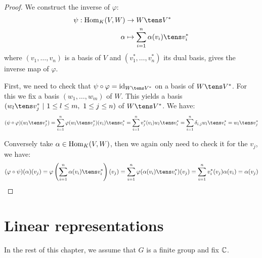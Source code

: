 \documentclass[twoside = false,	%
		headsepline,		%
		parskip = true,
		]{scrbook}						%
\begin{document}
    \begin{proof}
        We construct the inverse of $\varphi$:
        \begin{equation*}
        \begin{split}
            \psi: \Hom_K(V,W) &\to W \tens V^* \\
            \alpha &\mapsto \sum_{i=1}^n \alpha(v_i) \tens v_i^*
        \end{split}
        \end{equation*}
        where $(v_1,\dots,v_n)$ is a basis of $V$ and $(v_1^*,\dots,v_n^*)$ its dual basis, gives the inverse map of $\varphi$.
        
        First, we need to check that $\psi \circ \varphi = \id_{W \tens V^*}$ on a basis of $W \tens V^*$. For this we fix a basis $(w_1,\dots,w_m)$ of $W$. This yields a basis $(w_l \tens v_j^*\ | \ 1 \leq l \leq m, \ 1 \leq j \leq n)$ of $W \tens V^*$. We have:
        \begin{equation*}
        \begin{split}
            (\psi \circ \varphi)(w_l \tens v_j^*) = \sum_{i=1}^{n} \varphi(w_l \tens v_j^*)(v_i) \tens v_i^* = \sum_{i=1}^{n} v_j^*(v_i)w_l \tens v_i^* = \sum_{i=1}^n \delta_{i,j} w_l \tens v_i^* = w_l \tens v_j^*
        \end{split}
        \end{equation*}
        
        Conversely take $\alpha \in \mathrm{Hom}_K(V,W)$, then we again only need to check it for the $v_j$, we have:
        \begin{equation*}
        \begin{split}
            (\varphi \circ \psi)(\alpha)(v_j) = \varphi\round{\sum_{i=1}^n \alpha(v_i) \tens v_i^*}(v_j) = \sum_{i=1}^n \varphi(\alpha(v_i) \tens v_i^*)(v_j) = \sum_{i=1}^n v_i^*(v_j)  \alpha(v_i) = \alpha(v_j)
        \end{split}
        \end{equation*}
    \end{proof}
    
\section{Linear representations}
    In the rest of this chapter, we assume that $G$ is a finite group and fix $\mathbb C$.
    
\end{document}
